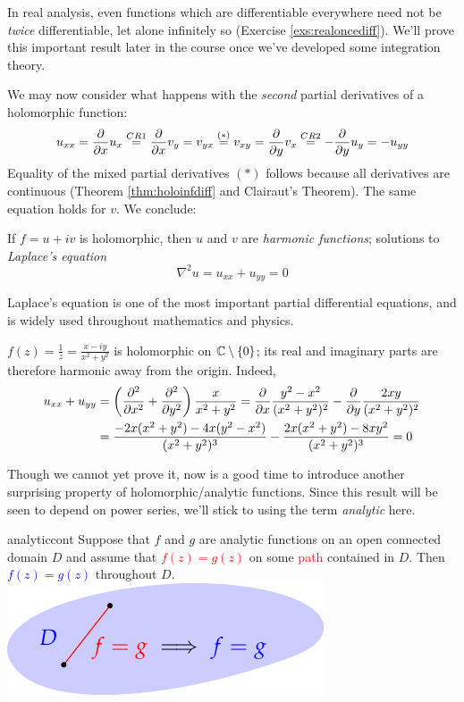 In real analysis, even functions which are differentiable everywhere need not be \emph{twice} differentiable, let alone infinitely so (Exercise \ref{exs:realoncediff}). We'll prove this important result later in the course once we've developed some integration theory.


We may now consider what happens with the \emph{second} partial derivatives of a holomorphic function:
\[u_{xx}=\partials xu_x\overset{CR1}{=}\partials xv_y =v_{yx}\overset{(\ast)}{=}v_{xy}=\partials yv_x\overset{CR2}{=}-\partials yu_y=-u_{yy}\]
Equality of the mixed partial derivatives $(\ast)$ follows because all derivatives are continuous (Theorem \ref{thm:holoinfdiff} and Clairaut's Theorem). The same equation holds for $v$. We conclude:

\begin{cor}{}{}
If $f=u+iv$ is holomorphic, then $u$ and $v$ are \emph{harmonic functions}; solutions to \emph{Laplace's equation}
\[\nabla^2u=u_{xx}+u_{yy}=0\]
\end{cor}

Laplace's equation is one of the most important partial differential equations, and is widely used throughout mathematics and physics.

\begin{example}{}{}
$f(z)=\frac 1z=\frac{x-iy}{x^2+y^2}$ is holomorphic on $\C\setminus\{0\}$; its real and imaginary parts are therefore harmonic away from the origin. Indeed,
\begin{align*}
u_{xx}+u_{yy}&=\left(\partials[^2]{x^2}+\partials[^2]{y^2}\right)\frac x{x^2+y^2} =\partials x\frac{y^2-x^2}{(x^2+y^2)^2}-\partials y\frac{2xy}{(x^2+y^2)^2}\\
&=\frac{-2x(x^2+y^2)-4x(y^2-x^2)}{(x^2+y^2)^3}-\frac{2x(x^2+y^2)-8xy^2}{(x^2+y^2)^3} =0
\end{align*}
\end{example}
\goodbreak


Though we cannot yet prove it, now is a good time to introduce another surprising property of holomorphic/analytic functions. Since this result will be seen to depend on power series, we'll stick to using the term \emph{analytic} here. 

\begin{thm}[lower separated=false, sidebyside, sidebyside align=top seam, sidebyside gap=0pt, righthand width=0.38\linewidth]{}{analyticcont}
Suppose that $f$ and $g$ are analytic functions on an open connected domain $D$ and assume that \textcolor{red}{$f(z)=g(z)$} on some \textcolor{red}{path} contained in $D$.\smallbreak
Then \textcolor{blue}{$f(z)=g(z)$} throughout $D$.
\tcblower
\flushright\includegraphics{analytic-topology2}
\end{thm}

